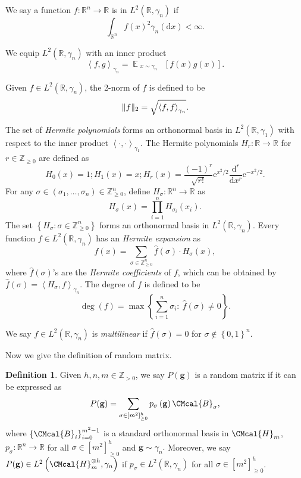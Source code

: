 \documentclass[11pt]{article}
\def\B{\CMcal{B}}
\def\H{\CMcal{H}}
\theoremstyle{plain}
\theoremstyle{definition}
\newtheorem{definition}[theorem]{Definition}
\newcommand {\minusspace} {\: \! \!}
\newcommand {\Fn} [2] {\ensuremath{ #1 \minusspace \Br{ #2 } }}
\newcommand{\reals}{{\mathbb R}}
\newcommand {\set} [1] {\ensuremath{ \left\lbrace #1 \right\rbrace }}
\newcommand {\innerproduct} [2] {\ensuremath{\left \langle #1 , #2 \right \rangle}}
\newcommand {\br} [1] {\ensuremath{ \left( #1 \right) }}
\newcommand {\Br} [1] {\ensuremath{ \left[ #1 \right] }}
\DeclarePairedDelimiter{\norm}{\lVert}{\rVert}
\newcommand {\normsub} [2] {\ensuremath{ \norm{#1}_{#2} }}
\newcommand {\twonorm} [1] {\normsub{#1}{2}}
\DeclareMathOperator*{\bigE}{\mathbb{E}}
\newcommand {\expec} [2] {\Fn{\bigE_{\substack{#1}}}{#2}}
\newcommand{\posint}{{\mathbb Z}_{>0}}
\newcommand{\e}{\mathrm{e}}
\renewcommand{\d}{\mathrm{d}}
\newcommand{\randg}{\ensuremath{\mathbf{g}}}
\newcommand{\1}{\mathbb{1}} %
\begin{document}
We say a function $f:\reals^n\rightarrow\reals$ is in $L^2\br{\reals,\gamma_n}$ if
\[\int_{\reals^n}f(x)^2\gamma_n\br{\d x}<\infty.\]

We equip $L^2\br{\reals,\gamma_n}$ with an inner product
\[\innerproduct{f}{g}_{\gamma_n}=\expec{x\sim\gamma_n}{f(x)g(x)}.\]

Given $f\in L^2\br{\reals,\gamma_n}$, the 2-norm of $f$ is defined to be
\[\twonorm{f}=\sqrt{\innerproduct{f}{f}_{\gamma_n}}.\]

     The set of {\em Hermite polynomials} forms an orthonormal basis in $L^2\br{\reals,\gamma_1}$ with respect to the inner product $\innerproduct{\cdot}{\cdot}_{\gamma_1}$. The Hermite polynomials $H_r:\reals\rightarrow\reals$ for $r\in\mathbb{Z}_{\geq 0}$ are defined as
	\begin{equation*}%
	H_0\br{x}=1; H_1\br{x}=x; H_r\br{x}=\frac{(-1)^r}{\sqrt{r!}}\e^{x^2/2}\frac{\d^r}{\d x^r}\e^{-x^2/2}.
	\end{equation*}
	For any $\sigma\in\br{\sigma_1,\ldots,\sigma_n}\in\mathbb{Z}_{\geq 0}^n$, define
	$H_{\sigma}:\reals^n\rightarrow\reals$ as \begin{equation*}%
	H_{\sigma}\br{x}=\prod_{i=1}^nH_{\sigma_i}\br{x_i}.
	\end{equation*}
	The set $\set{H_{\sigma}:\sigma\in\mathbb{Z}_{\geq 0}^n}$ forms an orthonormal basis in $L^2\br{\reals,\gamma_n}$. Every function $f\in L^2\br{\reals,\gamma_n}$ has an {\em Hermite expansion}  as
$$f\br{x}=\sum_{\sigma\in\mathbb{Z}_{\geq 0}^n}\widehat{f}\br{\sigma}\cdot H_{\sigma}\br{x},$$
	where $\widehat{f}\br{\sigma}$'s are the {\em Hermite coefficients} of $f$, which can be obtained by $\widehat{f}\br{\sigma}=\innerproduct{H_{\sigma}}{f}_{\gamma_n}$. The degree of $f$ is defined to be \[\deg\br{f}=\max\set{\sum_{i=1}^n\sigma_i:~\widehat{f}\br{\sigma}\neq 0}.\]

We say $f\in L^2\br{\reals,\gamma_n}$ is {\em multilinear} if $\widehat{f}\br{\sigma}=0$ for $\sigma\notin\set{0,1}^n$.

Now we give the definition of random matrix.
\begin{definition}\label{def:randomoperators}
		Given $h, n, m\in\posint$, we say $P(\randg)$ is a random matrix if it can be expressed as
		\begin{equation}\label{eqn:randomoperatorexpansion}
		P(\randg)=\sum_{\sigma\in[m^2]_{\geq 0}^h}p_{\sigma}\br{\mathbf{g}}\B_{\sigma},
		\end{equation}
 		where $\set{\B_i}_{i=0}^{m^2-1}$ is a standard orthonormal basis in $\H_m$, $p_{\sigma}:\reals^n\rightarrow\reals$ for all $\sigma\in[m^2]_{\geq 0}^h$ and $\mathbf{g}\sim \gamma_n.$ Moreover, we say $P(\randg)\in L^2\br{\H_m^{\otimes h},\gamma_n}$ if $p_{\sigma}\in L^2\br{\reals,\gamma_n}$ for all $\sigma\in[m^2]_{\geq 0}^h$.
	\end{definition}
\end{document}
